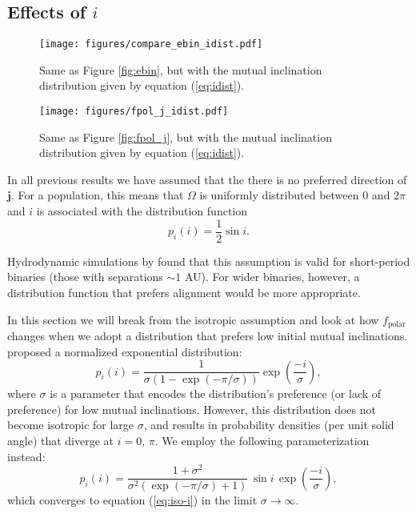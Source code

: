\documentclass[twocolumn,linenumbers]{aastex631}
\begin{document}
\subsection{Effects of $i$}
\label{subsec:change_i}

\begin{figure*}
    \begin{centering}
        \texttt{[image: figures/compare\_ebin\_idist.pdf]}
        \caption{
            Same as Figure \ref{fig:ebin}, but with the mutual inclination distribution given by equation (\ref{eq:idist}).
        }
        \label{fig:ebin-idist}
    \end{centering}
\end{figure*}

\begin{figure*}
    \begin{centering}
        \texttt{[image: figures/fpol\_j\_idist.pdf]}
        \caption{
            Same as Figure \ref{fig:fpol_j}, but with the mutual inclination distribution given by equation (\ref{eq:idist}).
        }
        \label{fig:fpol_j-idist}
    \end{centering}
\end{figure*}


In all previous results we have assumed that the there is no preferred direction of $\bm{j}$. For a population, this means that $\Omega$ is uniformly distributed between $0$ and $2\pi$ and $i$ is associated with the distribution function
\begin{equation}
    \label{eq:iso-i}
    p_i(i) = \frac{1}{2}\sin{i} .
\end{equation}

Hydrodynamic simulations by \citet{elsender2023} found that this assumption is valid for short-period binaries (those with separations $\sim 1$ AU). For wider binaries, however, a distribution function that prefers alignment would be more appropriate.

In this section we will break from the isotropic assumption and look at how $f_\text{polar}$ changes when we adopt a distribution that prefers low initial mutual inclinations. \citet{ceppi2024} proposed a normalized exponential distribution:
\begin{equation}
    p_i(i) = \frac{1}{\sigma(1-\exp{(-\pi/\sigma)})} \exp{\left(\frac{-i}{\sigma}\right)},
\end{equation}
where $\sigma$ is a parameter that encodes the distribution's preference (or lack of preference) for low mutual inclinations.
However, this distribution does not become isotropic for large $\sigma$, and results in probability densities (per unit solid angle) that diverge at $i=0,\,\pi$. We employ the following parameterization instead:
\begin{equation}
    \label{eq:idist}
    p_i(i) = \frac{1+\sigma^2}{\sigma^2 (\exp{(-\pi/\sigma)}+1)}\,\sin{i}\,\exp{\left(\frac{-i}{\sigma}\right)},
\end{equation}
which converges to equation (\ref{eq:iso-i}) in the limit $\sigma \rightarrow \infty$.
\end{document}
